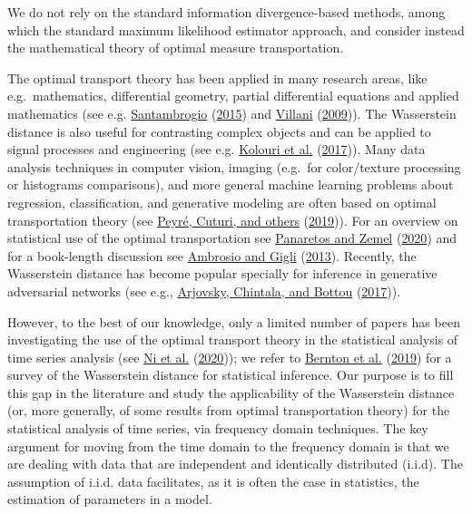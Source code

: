 \documentclass[
  11pt,
]{article}
\begin{document}
We do not rely on the standard information divergence-based methods,
among which the standard maximum likelihood estimator approach, and
consider instead the mathematical theory of optimal measure
transportation.

The optimal transport theory has been applied in many research areas,
like e.g.~mathematics, differential geometry, partial differential
equations and applied mathematics (see e.g.
\protect\hyperlink{ref-santambrogio2015optimal}{Santambrogio}
(\protect\hyperlink{ref-santambrogio2015optimal}{2015}) and
\protect\hyperlink{ref-villani2009optimal}{Villani}
(\protect\hyperlink{ref-villani2009optimal}{2009})). The Wasserstein
distance is also useful for contrasting complex objects and can be
applied to signal processes and engineering (see e.g.
\protect\hyperlink{ref-kolouri2017optimal}{Kolouri et al.}
(\protect\hyperlink{ref-kolouri2017optimal}{2017})). Many data analysis
techniques in computer vision, imaging (e.g.~for color/texture
processing or histograms comparisons), and more general machine learning
problems about regression, classification, and generative modeling are
often based on optimal transportation theory (see
\protect\hyperlink{ref-peyre2019computational}{Peyré, Cuturi, and
others} (\protect\hyperlink{ref-peyre2019computational}{2019})). For an
overview on statistical use of the optimal transportation see
\protect\hyperlink{ref-panaretos2020invitation}{Panaretos and Zemel}
(\protect\hyperlink{ref-panaretos2020invitation}{2020}) and for a
book-length discussion see
\protect\hyperlink{ref-ambrosio2013user}{Ambrosio and Gigli}
(\protect\hyperlink{ref-ambrosio2013user}{2013}). Recently, the
Wasserstein distance has become popular specially for inference in
generative adversarial networks (see e.g.,
\protect\hyperlink{ref-arjovsky2017wasserstein}{Arjovsky, Chintala, and
Bottou} (\protect\hyperlink{ref-arjovsky2017wasserstein}{2017})).

However, to the best of our knowledge, only a limited number of papers
has been investigating the use of the optimal transport theory in the
statistical analysis of time series analysis (see
\protect\hyperlink{ref-ni2020conditional}{Ni et al.}
(\protect\hyperlink{ref-ni2020conditional}{2020})); we refer to
\protect\hyperlink{ref-bernton2019parameter}{Bernton et al.}
(\protect\hyperlink{ref-bernton2019parameter}{2019}) for a survey of the
Wasserstein distance for statistical inference. Our purpose is to fill
this gap in the literature and study the applicability of the
Wasserstein distance (or, more generally, of some results from optimal
transportation theory) for the statistical analysis of time series, via
frequency domain techniques. The key argument for moving from the time
domain to the frequency domain is that we are dealing with data that are
independent and identically distributed (i.i.d). The assumption of
i.i.d. data facilitates, as it is often the case in statistics, the
estimation of parameters in a model.
\end{document}
